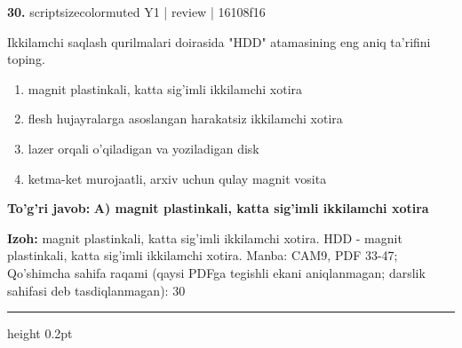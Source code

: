 \documentclass[10pt,a4paper]{article}
\begin{document}
{\bfseries\sffamily\color{ink} 30.} {scriptsizecolor{muted} Y1 | review | 16108f16}
\par
Ikkilamchi saqlash qurilmalari doirasida "HDD" atamasining eng aniq ta'rifini toping.
\begin{enumerate}[label=\Alph*),leftmargin=9mm]
\item magnit plastinkali, katta sig'imli ikkilamchi xotira
\item flesh hujayralarga asoslangan harakatsiz ikkilamchi xotira
\item lazer orqali o'qiladigan va yoziladigan disk
\item ketma-ket murojaatli, arxiv uchun qulay magnit vosita
\end{enumerate}
\begin{tcolorbox}[enhanced,breakable,colback=teal!4,colframe=teal!60!black,boxrule=0.45pt,arc=1.2mm,left=2.7mm,right=2.7mm,top=1.8mm,bottom=1.8mm,before skip=2mm,after skip=2mm]
{\bfseries\sffamily\color{teal}To'g'ri javob:} \textbf{A) magnit plastinkali, katta sig'imli ikkilamchi xotira}
\par\smallskip
{\bfseries Izoh:} magnit plastinkali, katta sig'imli ikkilamchi xotira. HDD - magnit plastinkali, katta sig'imli ikkilamchi xotira. Manba: CAM9, PDF 33-47; Qo'shimcha sahifa raqami (qaysi PDFga tegishli ekani aniqlanmagan; darslik sahifasi deb tasdiqlanmagan): 30
\end{tcolorbox}
\vspace{2mm}\hrule height 0.2pt\vspace{3mm}
\end{document}
